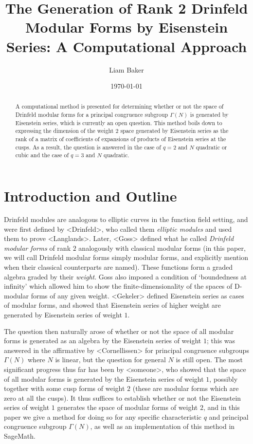 \documentclass{article}
\title{The Generation of Rank 2 Drinfeld Modular Forms by Eisenstein Series: A Computational Approach}
\author{Liam Baker}
\date{\today}
\begin{document}
 \maketitle

\begin{abstract}
  A computational method is presented for determining whether or not the space of Drinfeld modular forms for a principal congruence subgroup $\Gamma(N)$ is generated by Eisenstein series, which is currently an open question.
  This method boils down to expressing the dimension of the weight $2$ space generated by Eisenstein series as the rank of a matrix of coefficients of expansions of products of Eisenstein series at the cusps.
  As a result, the question is answered in the case of $q = 2$ and $N$ quadratic or cubic and the case of $q = 3$ and $N$ quadratic.
\end{abstract}


\section{Introduction and Outline}

Drinfeld modules are analogous to elliptic curves in the function field setting, and were first defined by <Drinfeld>, who called them \emph{elliptic modules} and used them to prove <Langlands>.
Later, <Goss> defined what he called \emph{Drinfeld modular forms} of rank $2$ analogously with classical modular forms (in this paper, we will call Drinfeld modular forms simply modular forms, and explicitly mention when their classical counterparts are named).
These functions form a graded algebra graded by their \emph{weight}.
Goss also imposed a condition of `boundedness at infinity' which allowed him to show the finite-dimensionality of the spaces of D-modular forms of any given weight.
<Gekeler> defined Eisenstein series as cases of modular forms, and showed that Eisenstein series of higher weight are generated by Eisenstein series of weight $1$.

The question then naturally arose of whether or not the space of all modular forms is generated as an algebra by the Eisenstein series of weight $1$; this was answered in the affirmative by <Cornellissen> for principal congruence subgroups $\Gamma(N)$ where $N$ is linear, but the question for general $N$ is still open.
The most significant progress thus far has been by <someone>, who showed that the space of all modular forms is generated by the Eisenstein series of weight $1$, possibly together with some cusp forms of weight $2$ (these are modular forms which are zero at all the cusps).
It thus suffices to establish whether or not the Eisenstein series of weight $1$ generates the space of modular forms of weight $2$, and in this paper we give a method for doing so for any specific characteristic $q$ and principal congruence subgroup $\Gamma(N)$, as well as an implementation of this method in SageMath.
\end{document}
